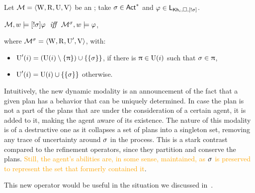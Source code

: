 \begin{definition}\label{def:srefsemantics}
Let $\mathcal{M} = \langle \operatorname{W}, \operatorname{R}, \operatorname{U}, \operatorname{V} \rangle$ be an \ults; take $\sigma \in {\rm \sf Act}^*$ and $\varphi \in \mathsf{L}_{{\sf Kh}_i,\square,[!\sigma]}$.
\begin{spcenter}
$\mathcal{M},w \models [!\sigma]\varphi \ \ \mbox{\it iff} \ \ \mathcal{M}^\sigma,w \models \varphi$,
\end{spcenter}
where $\mathcal{M}^\sigma = \langle \operatorname{W},\operatorname{R},\operatorname{U}',\operatorname{V} \rangle$, with:
\begin{itemize}
\item $\operatorname{U}'(i) = (\operatorname{U}(i) \setminus \{ \uppi \}) \cup \{ \{ \sigma \} \}$, if there is $\uppi \in \operatorname{U}(i)$ such that $\sigma \in \uppi$,
\item $\operatorname{U}'(i) = \operatorname{U}(i) \cup \{ \{ \sigma \} \}$ otherwise.

\end{itemize}
\end{definition}

\medskip

Intuitively, the new dynamic modality is an announcement of the fact that a given plan has a behavior that can be uniquely determined. In case the plan is not a part of the plans that are under the consideration of a certain agent, it is added to it, making the agent aware of its existence. 
The nature of this modality is of a destructive one as it collapses a set of plans into a singleton set, removing any trace of uncertainty around $\sigma$ in the process. This is a stark contrast compared to the refinement operators, since they partition and conserve the plans. \textcolor{orange}{Still, the agent's abilities are, in some sense, maintained, as $\sigma$ is preserved to represent the set that formerly contained it}.

\medskip

This new operator would be useful in the situation we discussed in~.

\medskip 

